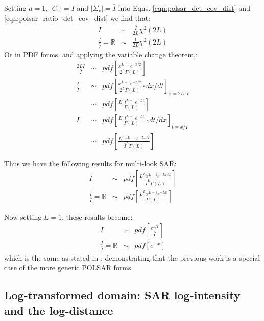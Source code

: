 \documentclass[journal]{IEEEtran}
\begin{document}
Setting $d=1$, $|C_v|=I$ and $|\Sigma_v|=\bar{I}$ into Eqns. \ref{eqn:polsar_det_cov_dist} and \ref{eqn:polsar_ratio_det_cov_dist}
we find that:
\begin{eqnarray*}
  I &\sim& \frac{\bar{I}}{2L} \chi^2(2L)  \\
  \frac{I}{\bar{I}} = \mathbb{R} &\sim& \frac{1}{2L}  \chi^2(2L)   
\end{eqnarray*}
Or in PDF forms, and applying the variable change theorem,:
\begin{eqnarray*}
    \frac{2L I}{\bar{I}} &\sim& pdf \left[ \frac{x^{L-1}e^{-x/2}}{2^L \Gamma(L)} \right] \\
  \frac{I}{\bar{I}} &\sim& pdf \left[ \frac{x^{L-1}e^{-x/2}}{2^L \Gamma(L)} \cdot dx/dt \right]_{x=2L \cdot t} \\
    &\sim& pdf \left[ \frac{ L^{L} t^{L-1} e^{-Lt}}{ \Gamma(L)} \right] \\
  I &\sim& pdf \left[ \frac{ L^{L} t^{L-1} e^{-Lt}}{ \Gamma(L)} \cdot dt/dx \right]_{t=x/\bar{I}}  \\
    &\sim& pdf \left[ \frac{ L^{L} x^{L-1} e^{-Lx/\bar{I}}}{ \bar{I}^{L}\Gamma(L)} \right]
\end{eqnarray*}

Thus we have the following results for multi-look SAR:
\begin{eqnarray}
    I &\sim& pdf \left[ \frac{ L^{L} x^{L-1} e^{-Lx/\bar{x}}}{ \bar{I}^{L}\Gamma(L)} \right] \label{eqn:multi_look_SAR_intensity_dist} \\
    \frac{I}{\bar{I}} = \mathbb{R} &\sim& pdf \left[ \frac{ L^{L} x^{L-1} e^{-Lx}}{ \Gamma(L)} \label{eqn:multi_look_SAR_ratio_dist} \right] 
\end{eqnarray}

Now setting $L=1$, these results become:
\begin{eqnarray}
    I &\sim& pdf \left[ \frac{ e^{x/\bar{I}}}{ \bar{I}} \right] \\
    \frac{I}{\bar{I}} = \mathbb{R} &\sim& pdf \left[ e^{-x} \right] 
\end{eqnarray}
which is the same as stated in \cite{Le_2010_ACRS}, demonstrating that the previous work is a special case of the more generic POLSAR forms.

\subsection{Log-transformed domain: SAR log-intensity and the log-distance}
\end{document}
